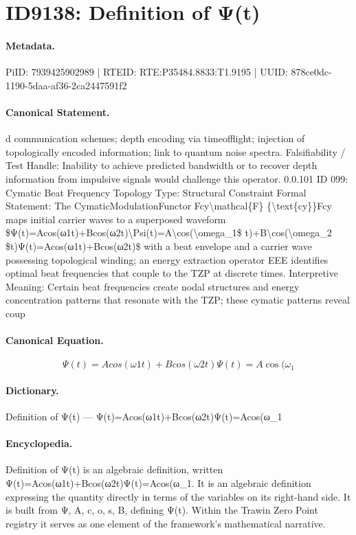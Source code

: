 \section*{ID9138: Definition of Ψ(t)}
\paragraph{Metadata.}
PiID: 7939425902989 | RTEID: RTE:P35484.8833:T1.9195 | UUID: 878ce0dc-1190-5daa-af36-2ca2447591f2

\paragraph{Canonical Statement.}
d communication schemes; depth encoding via timeofflight; injection of topologically encoded information; link to quantum noise spectra. Falsifiability / Test Handle: Inability to achieve predicted bandwidth or to recover depth information from impulsive signals would challenge this operator. 0.0.101 ID 099: Cymatic Beat Frequency Topology Type: Structural Constraint Formal Statement: The CymaticModulationFunctor Fcy\textbackslash{}mathcal\{F\} \{\textbackslash{}text\{cy\}\}Fcy maps initial carrier waves to a superposed waveform \$Ψ(t)=Acos(ω1t)+Bcos(ω2t)\textbackslash{}Psi(t)=A\textbackslash{}cos(\textbackslash{}omega\_1\$ t)+B\textbackslash{}cos(\textbackslash{}omega\_2 \$t)Ψ(t)=Acos(ω1t)+Bcos(ω2t)\$ with a beat envelope and a carrier wave possessing topological winding; an energy extraction operator EEE identifies optimal beat frequencies that couple to the TZP at discrete times. Interpretive Meaning: Certain beat frequencies create nodal structures and energy concentration patterns that resonate with the TZP; these cymatic patterns reveal coup

\paragraph{Canonical Equation.}
\[
Ψ(t)=Acos(ω1t)+Bcos(ω2t)\Psi(t)=A\cos(\omega_1
\]

\paragraph{Dictionary.}
Definition of Ψ(t) — Ψ(t)=Acos(ω1t)+Bcos(ω2t)Ψ(t)=Acos(ω\_1

\paragraph{Encyclopedia.}
Definition of Ψ(t) is an algebraic definition, written Ψ(t)=Acos(ω1t)+Bcos(ω2t)Ψ(t)=Acos(ω\_1. It is an algebraic definition expressing the quantity directly in terms of the variables on its right-hand side. It is built from Ψ, A, c, o, s, B, defining Ψ(t). Within the Trawin Zero Point registry it serves as one element of the framework's mathematical narrative.

